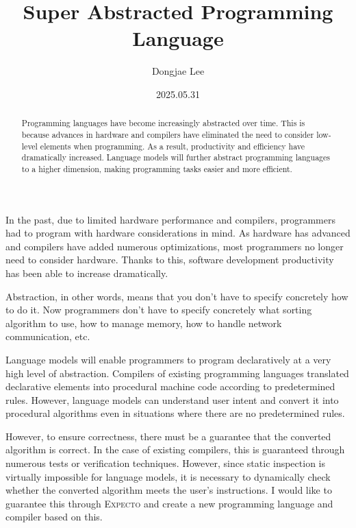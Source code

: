 \documentclass[11pt, oneside]{article}
\title{Super Abstracted Programming Language}
\author{Dongjae Lee}
\date{2025.05.31}
\begin{document}
\maketitle

\begin{abstract}
	Programming languages have become increasingly abstracted over time. This is because advances in hardware and compilers have eliminated the need to consider low-level elements when programming. As a result, productivity and efficiency have dramatically increased. Language models will further abstract programming languages to a higher dimension, making programming tasks easier and more efficient.
\end{abstract}

In the past, due to limited hardware performance and compilers, programmers had
to program with hardware considerations in mind. As hardware has advanced and
compilers have added numerous optimizations, most programmers no longer need to
consider hardware. Thanks to this, software development productivity has been
able to increase dramatically.

Abstraction, in other words, means that you don't have to specify concretely
how to do it. Now programmers don't have to specify concretely what sorting
algorithm to use, how to manage memory, how to handle network communication,
etc.

Language models will enable programmers to program declaratively at a very high
level of abstraction. Compilers of existing programming languages translated
declarative elements into procedural machine code according to predetermined
rules. However, language models can understand user intent and convert it into
procedural algorithms even in situations where there are no predetermined
rules.

However, to ensure correctness, there must be a guarantee that the converted
algorithm is correct. In the case of existing compilers, this is guaranteed
through numerous tests or verification techniques. However, since static
inspection is virtually impossible for language models, it is necessary to
dynamically check whether the converted algorithm meets the user's
instructions. I would like to guarantee this through \textsc{Expecto} and
create a new programming language and compiler based on this.
\end{document}
